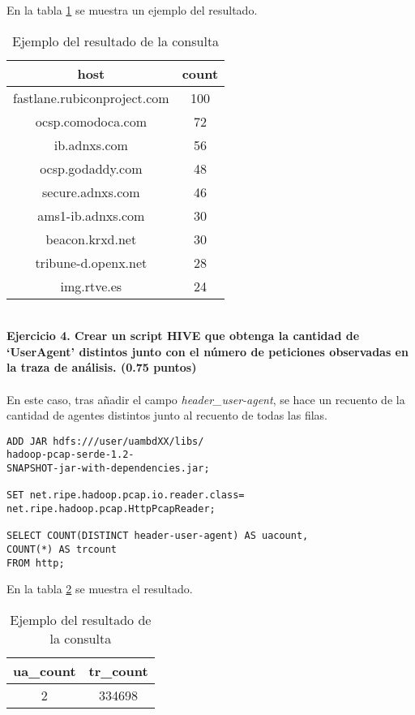 En la tabla \ref{tab:c3} se muestra un ejemplo del resultado.
\begin{table}[ht]
	\centering
	\caption{Ejemplo del resultado de la consulta}
	\begin{tabular}[t]{cc}
		host & count \\
		\hline
		fastlane.rubiconproject.com	& 100 \\
		ocsp.comodoca.com &	72\\
		ib.adnxs.com &	56\\
		ocsp.godaddy.com &	48\\
		secure.adnxs.com &	46\\
		ams1-ib.adnxs.com &	30\\
		beacon.krxd.net &	30\\
		tribune-d.openx.net &	28\\
		img.rtve.es	& 24 
	\end{tabular}
	\label{tab:c3}
\end{table}%
\\
\textbf{Ejercicio 4. Crear un script HIVE que obtenga la cantidad de ‘UserAgent’ distintos junto con el número de
	peticiones observadas en la traza de análisis. (0.75 puntos)}\\\\
En este caso, tras añadir el campo \textit{header\_user-agent}, se hace un recuento de la cantidad de agentes distintos junto al recuento de todas las filas.
\begin{lstlisting}[caption=Consulta para obtener el resúmen de agentes.]
ADD JAR hdfs:///user/uambdXX/libs/
hadoop-pcap-serde-1.2-
SNAPSHOT-jar-with-dependencies.jar;

SET net.ripe.hadoop.pcap.io.reader.class=
net.ripe.hadoop.pcap.HttpPcapReader;

SELECT COUNT(DISTINCT header-user-agent) AS uacount,
COUNT(*) AS trcount 
FROM http;
\end{lstlisting}
En la tabla \ref{tab:c4} se muestra el resultado.\\
\begin{table}[ht]
	\centering
	\caption{Ejemplo del resultado de la consulta}
	\begin{tabular}[t]{cc}
		ua\_count & tr\_count \\
		\hline
		 2 &	334698
	\end{tabular}
	\label{tab:c4}
\end{table}%
